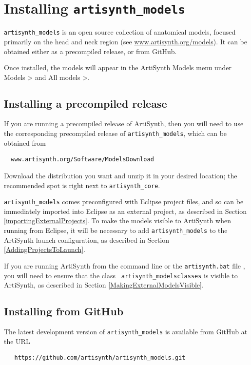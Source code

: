 \section{Installing {\tt artisynth\_models}}
\label{ArtiSynthModels}

{\tt artisynth\_models} is an open source collection of anatomical
models, focused primarily on the head and neck region
(see \href{https://www.artisynth.org/models}{www.artisynth.org/models}).
It can be obtained either as a precompiled release, or from GitHub.

Once installed, the models will appear in the ArtiSynth {\sf Models}
menu under {\sf Models >} and {\sf All models >}.

\subsection{Installing a precompiled release}

If you are running a precompiled release of ArtiSynth,
then you will need to use the corresponding precompiled release
of {\tt artisynth\_models}, which can be 
obtained from
\begin{verbatim}
  www.artisynth.org/Software/ModelsDownload
\end{verbatim}
Download the distribution you want and unzip it in your desired location;
the recommended spot is right next to {\tt artisynth\_core}.

{\tt artisynth\_models} comes preconfigured with Eclipse project
files, and so can be immediately imported into Eclipse as an external
project, as described in Section \ref{importingExternalProjects}.  To
make the models visible to ArtiSynth when running from Eclipse, it
will be necessary to add {\tt artisynth\_models} to the ArtiSynth
launch configuration, as described in Section
\ref{AddingProjectsToLaunch}.

If you are running ArtiSynth from the command line
\ifWindows
or the {\tt artisynth.bat} file%
\fi
, you will need to ensure that the class \directory{} {\tt
artisynth\_models\SEP classes} is visible to ArtiSynth, as described
in Section \ref{MakingExternalModelsVisible}.

\subsection{Installing from GitHub}

The latest development version of {\tt artisynth\_models} is available
from GitHub at the URL
\begin{verbatim}
   https://github.com/artisynth/artisynth_models.git
\end{verbatim}

